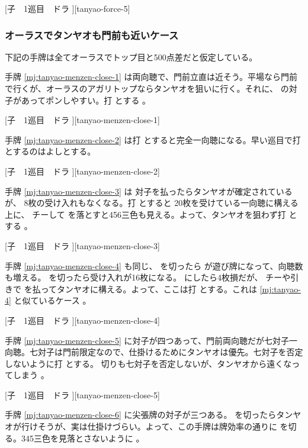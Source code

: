 \documentclass[../nankiru_main.tex]{subfiles}
\begin{document}
[子　1巡目　ドラ ][tanyao-force-5]


\subsubsection*{オーラスでタンヤオも門前も近いケース}

下記の手牌は全てオーラスでトップ目と500点差だと仮定している。

手牌 \ref{mj:tanyao-menzen-close-1} は両向聴で、門前立直は近そう。平場なら門前で行くが、オーラスのアガリトップならタンヤオを狙いに行く。それに、  の対子があってポンしやすい。打  とする \citep[][pp.~41--42]{kawamura-naki}。

[子　1巡目　ドラ ][tanyao-menzen-close-1]

手牌 \ref{mj:tanyao-menzen-close-2} は打  とすると完全一向聴になる。早い巡目で打  とするのはよしとする。

[子　1巡目　ドラ ][tanyao-menzen-close-2]

手牌 \ref{mj:tanyao-menzen-close-3} は  対子を払ったらタンヤオが確定されているが、 8枚の受け入れもなくなる。打  とすると 20枚を受けている一向聴に構える上に、 チーして  を落とすと456三色も見える。よって、タンヤオを狙わず打  とする \citep[][pp.~43--44]{kawamura-naki}。

[子　1巡目　ドラ ][tanyao-menzen-close-3]

手牌 \ref{mj:tanyao-menzen-close-4} も同じ、 を切ったら  が遊び牌になって、向聴数も増える。 を切ったら受け入れが16枚になる。 にしたら4枚損だが、 チーや引きで  を払ってタンヤオに構える。よって、ここは打  とする。これは \ref{mj:tanyao-4} と似ているケース \citep[][pp.~43--44]{kawamura-naki}。

[子　1巡目　ドラ ][tanyao-menzen-close-4]

手牌 \ref{mj:tanyao-menzen-close-5} に対子が四つあって、門前両向聴だが七対子一向聴。七対子は門前限定なので、仕掛けるためにタンヤオは優先。七対子を否定しないように打  とする。 切りも七対子を否定しないが、タンヤオから遠くなってしまう \citep[][pp.~57--58]{kawamura-naki}。

[子　1巡目　ドラ ][tanyao-menzen-close-5]

手牌 \ref{mj:tanyao-menzen-close-6} に尖張牌の対子が三つある。 を切ったらタンヤオが行けそうが、実は仕掛けづらい。よって、この手牌は牌効率の通りに  を切る。345三色を見落とさないように \citep[][pp.~59--60]{kawamura-naki}。
\end{document}
